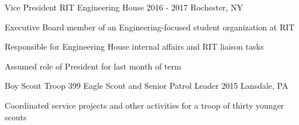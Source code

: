 
\begin{cvexperiences}
	\cvexperience
		{Vice President}
		{RIT Engineering House}
		{2016 - 2017}
		{Rochester, NY}
		{
			\begin{cvitems}
			\item {Executive Board member of an Engineering-focused student organization at RIT}
			\item {Responsible for Engineering House internal affairs and RIT liaison tasks}
			\item {Assumed role of President for last month of term}
			\end{cvitems}
		}

	\cvexperience
		{Boy Scout Troop 399}
		{Eagle Scout and Senior Patrol Leader}
		{2015}
		{Lansdale, PA}
		{
			\begin{cvitems}
			\item{Coordinated service projects and other activities for a troop of thirty younger scouts}
			\end{cvitems}
		}
\end{cvexperiences}
